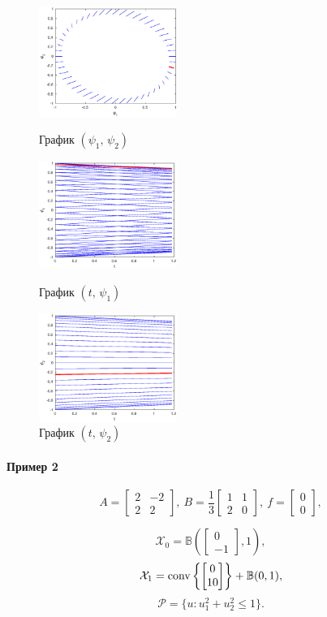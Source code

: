 \documentclass[11pt]{article}
\newcommand\PS{\mathcal{P}}
\newcommand\X{\mathcal{X}}
\newcommand\Cl[2]{\begin{bmatrix}
#1 \\ #2
\end{bmatrix}}
\newcommand\Conv[1]{{\rm conv}\left\{ #1 \right\}}
\begin{document}
\begin{figure}[h]
\begin{multicols}{3}
	\hfill
	\includegraphics[width=45mm]{1pp.eps}
	\hfill
	\caption{График $(\psi_1, \, \psi_2)$}
	\hfill
	\includegraphics[width=45mm]{1tp1.eps}
	\hfill
	\caption{График $(t, \, \psi_1)$}
    \hfill
	\includegraphics[width=45mm]{1tp2.eps}
	\hfill
	\caption{График $(t, \, \psi_2)$}
\end{multicols}
\end{figure}		

\newpage
\paragraph{Пример 2\\}
\begin{equation}
A = \begin{bmatrix}
2 & -2 \\ 2 & 2
\end{bmatrix},\ 
B = \frac13\begin{bmatrix}
1 & 1 \\ 2 & 0
\end{bmatrix}, \
f = \begin{bmatrix}
0 \\ 0
\end{bmatrix},
\end{equation}

$$\X_0 = \mathbb{B}\left(\Cl{0}{-1}, 1\right),$$
$$\X_1 = \Conv{\Cl{0}{10}} + \mathbb{B}(0, 1),$$
$$\PS = \{u\colon u_1^2 + u_2^2 \le 1\}.$$
\end{document}
